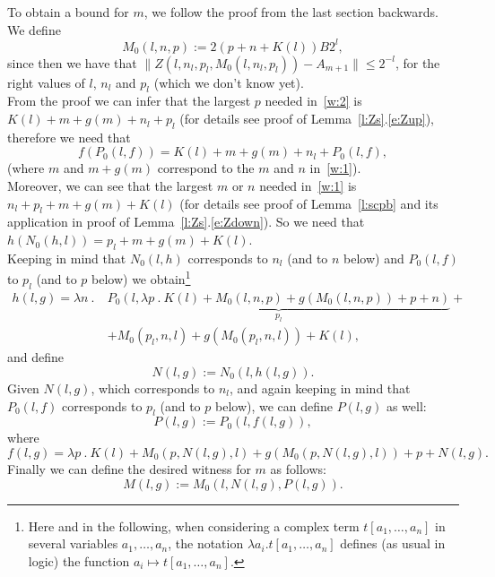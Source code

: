 To obtain a bound for $m$, we follow the proof from the last section backwards. We define 
\[
M_0(l,n,p):=2(p + n + K(l))B2^l,
\]
since then we have that $\|Z(l,n_l,p_l,M_0(l,n_l,p_l))-A_{m+1}\|\leq 2^{-l}$, for the 
right values of $l$, $n_l$ and $p_l$ (which we don't know yet).\\
From the proof we can infer that the largest $p$ needed in~\eqref{w:2} is $K(l)+m+g(m)+n_l+p_l$ (for details
see proof of Lemma~\ref{l:Zs}.\eqref{e:Zup}), therefore we need that
\[f(P_0(l,f))=K(l)+m+g(m)+n_l+P_0(l,f),\]
(where $m$ and $m+g(m)$ correspond to the $m$ and $n$ in~\eqref{w:1}). \\
Moreover, we can see that the largest $m$ or $n$ needed in~\eqref{w:1} is $n_l+p_l+m+g(m)+K(l)$ (for details
see proof of Lemma~\ref{l:scpb} and its application in proof of Lemma~\ref{l:Zs}.\eqref{e:Zdown}). So we need that
$h(N_0(h,l))=p_l+m+g(m)+K(l)$. \\
Keeping in mind that $N_0(l,h)$ corresponds to $n_l$ (and to $n$ below) and $P_0(l,f)$ to $p_l$ (and to $p$ below) 
we obtain\footnote{
Here and in the following, when considering a complex term $t[a_1,\ldots,a_n]$ in several variables $a_1,\ldots,a_n$,
the notation $\lambda a_i.t[a_1,\ldots,a_n]$ defines (as usual in logic) the function $a_i\mapsto t[a_1,\ldots,a_n]$.}
\begin{align*}
 h(l,g) = \lambda n\ .\ &\underbrace{P_0(l,\lambda p\ .\ K(l)+M_0(l,n,p)+g(M_0(l,n,p))+p+n)}_{p_l} + \\
&+M_0(p_l,n,l) + g(M_0(p_l,n,l))+K(l),
\end{align*}
and define
\[
N(l,g):=N_0(l, h(l,g)).
\]
Given $N(l,g)$, which corresponds to $n_l$, and again keeping in mind that $P_0(l,f)$ corresponds to $p_l$ (and to $p$ below),
we can define $P(l,g)$ as well:
\[
P(l,g):=P_0(l, f(l,g)),
\]
where
$ f(l,g) = \lambda p\ .\ K(l)+M_0(p,N(l,g),l)+g(M_0(p,N(l,g),l))+p+N(l,g).$
Finally we can define the desired witness for $m$ as follows:
\[
M(l,g):=M_0( l, N(l,g), P(l,g) ).
\]



